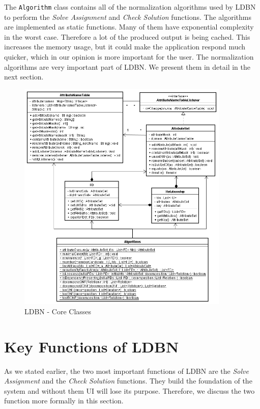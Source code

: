 The \verb=Algorithm= class contains all of the normalization algorithms used by LDBN to perform 
the \textit{Solve Assignment} and \textit{Check Solution} functions. The algorithms are implemented 
as static functions. Many of them have exponential complexity in the worst
case. Therefore a lot of the produced output is being cached. This increases the
memory usage, but it could make the application respond much quicker, which
in our opinion is more important for the user. The normalization algorithms are very important 
part of LDBN. We present them in detail in the next section. 

\begin{figure}[h]
  \begin{center}
    \includegraphics[width=0.9\textwidth]{./img/uml02.png}
    \caption{LDBN - Core Classes}
    \label{fig:coreuml}
  \end{center}
\end{figure}



\section{Key Functions of LDBN}
\label{sec:keyfunctions}
As we stated earlier, the two most important functions of LDBN are the \textit{Solve Assignment} and 
the \textit{Check Solution} functions. They build the foundation of the system and
without them UI will lose its purpose. Therefore, we
discuss the two function more formally in this section.


